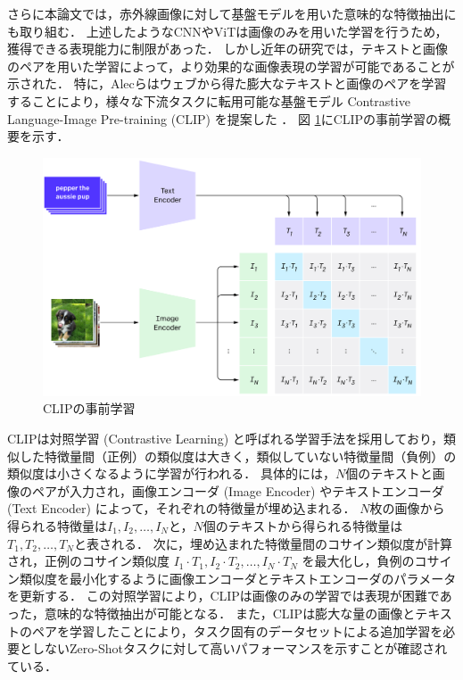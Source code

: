 さらに本論文では，赤外線画像に対して基盤モデルを用いた意味的な特徴抽出にも取り組む．
上述したようなCNNやViTは画像のみを用いた学習を行うため，獲得できる表現能力に制限があった．
しかし近年の研究では，テキストと画像のペアを用いた学習によって，より効果的な画像表現の学習が可能であることが示された．
特に，Alecらはウェブから得た膨大なテキストと画像のペアを学習することにより，様々な下流タスクに転用可能な基盤モデル Contrastive Language-Image Pre-training (CLIP) を提案した \cite{clip}．
図 \ref{fig:clip-a}にCLIPの事前学習の概要を示す．
% 
\begin{figure}[tbp]
  \centering
  \includegraphics[width=\linewidth, keepaspectratio]{image/clip-a.png}
  \caption{CLIPの事前学習 \cite{clip}}
  \label{fig:clip-a}
\end{figure}
% 
CLIPは対照学習 (Contrastive Learning) と呼ばれる学習手法を採用しており，類似した特徴量間（正例）の類似度は大きく，類似していない特徴量間（負例）の類似度は小さくなるように学習が行われる．
具体的には，$N$個のテキストと画像のペアが入力され，画像エンコーダ (Image Encoder) やテキストエンコーダ (Text Encoder) によって，それぞれの特徴量が埋め込まれる．
$N$枚の画像から得られる特徴量は$I_1, I_2, \ldots, I_N$と，$N$個のテキストから得られる特徴量は$T_1, T_2, \ldots, T_N$と表される．
次に，埋め込まれた特徴量間のコサイン類似度が計算され，正例のコサイン類似度 $I_1 \cdot T_1, I_2 \cdot T_2, \ldots, I_N \cdot T_N$ を最大化し，負例のコサイン類似度を最小化するように画像エンコーダとテキストエンコーダのパラメータを更新する．
この対照学習により，CLIPは画像のみの学習では表現が困難であった，意味的な特徴抽出が可能となる．
また，CLIPは膨大な量の画像とテキストのペアを学習したことにより，タスク固有のデータセットによる追加学習を必要としないZero-Shotタスクに対して高いパフォーマンスを示すことが確認されている．

